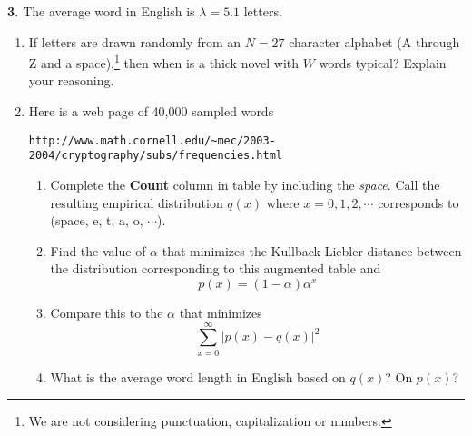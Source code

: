 \textbf{3.}
\label{SquishyBear}
The average word in English is $\lambda =5.1$ letters.
    \begin{enumerate}
       \item  If letters are drawn randomly from an $N=27$ character alphabet (A through Z and a space),\footnote{
                            We are not considering punctuation, capitalization or numbers.
                            }
       then when is a thick novel with $W$ words typical? Explain your reasoning.
       \item Here is a web page of 40,000 sampled words
                        \begin{center}
                        \verb"http://www.math.cornell.edu/~mec/2003-2004/cryptography/subs/frequencies.html"
                        \end{center}
             \begin{enumerate}
                     \item Complete the {\bf Count} column in table by including the {\em space}. Call the resulting empirical distribution $q(x)$ where $x=0,1,2,\cdots$ corresponds to (space, e, t, a, o, $\cdots$).
                     \item Find the value of $\alpha$ that minimizes the Kullback-Liebler distance between the distribution corresponding to this augmented table and
                            $$p(x) = (1-\alpha) \alpha^x $$
                     \item Compare this to the $\alpha$ that minimizes
                            $$ \sum_{x=0}^\infty \left| p(x) -  q(x) \right|^2 $$
                     \item What is the average word length in English based on $q(x)$? On $p(x)$?
             \end{enumerate}
       \end{enumerate}
